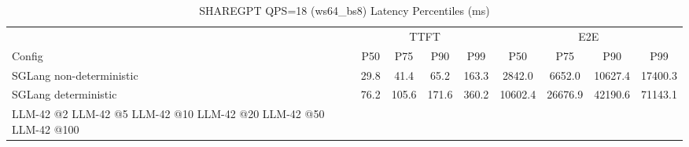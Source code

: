 \begin{table}[htbp]
\centering
\caption{SHAREGPT QPS=18 (ws64_bs8) Latency Percentiles (ms)}
\label{tab:sharegpt_qps18_ws64_bs8}
\begin{tabular}{l|cccc|cccc}
\toprule
& \multicolumn{4}{c|}{TTFT} & \multicolumn{4}{c}{E2E} \\
Config & P50 & P75 & P90 & P99 & P50 & P75 & P90 & P99 \\
\midrule
SGLang non-deterministic & 29.8 & 41.4 & 65.2 & 163.3 & 2842.0 & 6652.0 & 10627.4 & 17400.3 \\
SGLang deterministic & 76.2 & 105.6 & 171.6 & 360.2 & 10602.4 & 26676.9 & 42190.6 & 71143.1 \\
LLM-42 @2%
LLM-42 @5%
LLM-42 @10%
LLM-42 @20%
LLM-42 @50%
LLM-42 @100%
\bottomrule
\end{tabular}
\end{table}
